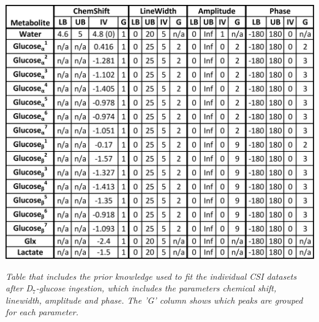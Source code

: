 \documentclass[class=article, crop=false]{standalone}
\begin{document}
\begin{table}[H]
    \centering
    \includegraphics[width = 1\textwidth]{Figures/Glucose/Prior_Table.png}
    \caption{\textit{Table that includes the prior knowledge used to fit the individual CSI datasets after D$_7$-glucose ingestion, which includes the parameters chemical shift, linewidth, amplitude and phase. The 'G' column shows which peaks are grouped for each parameter.}}
    \label{fig:Glu:Prior}
\end{table}
\end{document}
